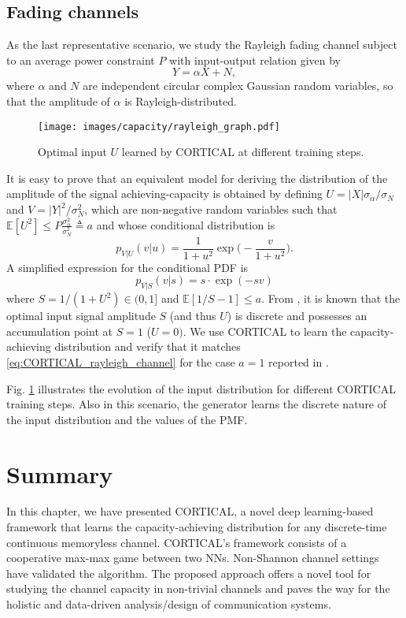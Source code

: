 \subsection{Fading channels}
As the last representative scenario, we study the Rayleigh fading channel subject to an average power constraint $P$ with input-output relation given by
\begin{equation}
    Y = \alpha X + N,
\end{equation}
where $\alpha$ and $N$ are independent circular complex Gaussian random variables, so that the amplitude of $\alpha$ is Rayleigh-distributed.
\begin{figure}
	\centering
	\texttt{[image: images/capacity/rayleigh\_graph.pdf]}
	\caption{Optimal input $U$ learned by CORTICAL at different training steps.}
	\label{fig:CORTICAL_rayleigh}
\end{figure} 
It is easy to prove that an equivalent model for deriving the distribution of the amplitude of the signal achieving-capacity is obtained by defining $U=|X|\sigma_{\alpha}/\sigma_N$ and $V=|Y|^2/\sigma_N^2$, which are non-negative random variables such that $\mathbb{E}[U^2]\leq P\frac{\sigma_{\alpha}^2}{\sigma_N^2}\triangleq a$ and whose conditional distribution is
\begin{equation}
    p_{V|U}(v|u) = \frac{1}{1+u^2} \exp \biggl(-\frac{v}{1+u^2}\biggr).
\end{equation}
A simplified expression for the conditional PDF is 
\begin{equation}
\label{eq:CORTICAL_rayleigh_channel}
    p_{V|S}(v|s) = s \cdot \exp (-sv)
\end{equation}
where $S = 1/(1+U^2) \in (0,1]$ and $\mathbb{E}[1/S-1]\leq a$.
From \cite{Faycal2001}, it is known that the optimal input signal amplitude $S$ (and thus $U$) is discrete and possesses an accumulation point at $S=1$ ($U=0)$. We use CORTICAL to learn the capacity-achieving distribution and verify that it matches \eqref{eq:CORTICAL_rayleigh_channel} for the case $a=1$ reported in \cite{Faycal2001}. 

Fig. \ref{fig:CORTICAL_rayleigh} illustrates the evolution of the input distribution for different CORTICAL training steps. Also in this scenario, the generator learns the discrete nature of the input distribution and the values of the PMF. %

\section{Summary}
\label{sec:cortical_conclusions}
In this chapter, we have presented CORTICAL, a novel deep learning-based framework that learns the capacity-achieving distribution for any discrete-time continuous memoryless channel. CORTICAL's framework consists of a cooperative max-max game between two NNs. Non-Shannon channel settings have validated the algorithm. The proposed approach offers a novel tool for studying the channel capacity in non-trivial channels and paves the way for the holistic and data-driven analysis/design of communication systems. 